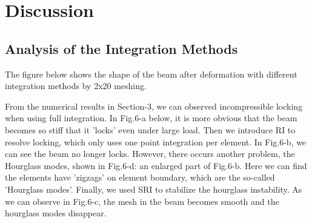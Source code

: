 \documentclass{article}
\begin{document}
\section{Discussion}
\subsection{Analysis of the Integration Methods}

\vspace*{0.5em}

The figure below shows the shape of the beam after deformation with different integration methods by 2x20 meshing.

From the numerical results in Section-3, we can observed incompressible locking when using full integration. In Fig.6-a below, it is more obvious that the beam becomes so stiff that it 'locks' even under large load. Then we introduce RI to resolve locking, which only uses one point integration per element. In Fig.6-b, we can see the beam no longer locks. However, there occurs another problem, the Hourglass modes, shown in Fig.6-d: an enlarged part of Fig.6-b. Here we can find the elements have 'zigzags' on element boundary, which are the so-called 'Hourglass modes'. Finally, we used SRI to stabilize the hourglass instability. As we can observe in Fig.6-c, the mesh in the beam becomes smooth and the hourglass modes disappear.
\end{document}
